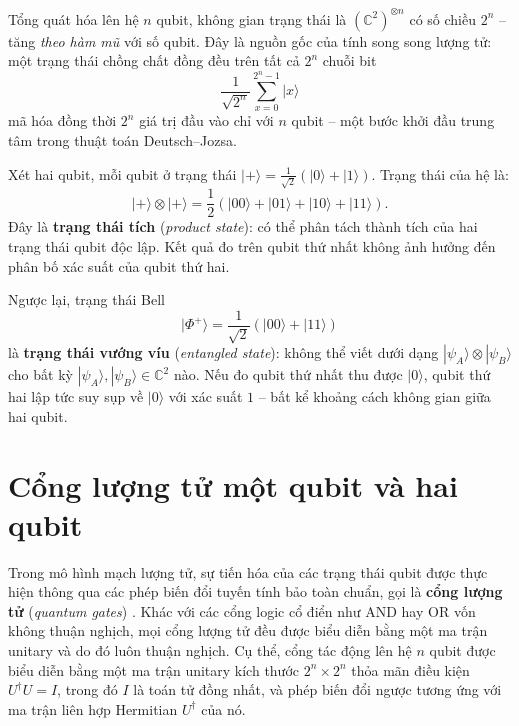 Tổng quát hóa lên hệ $n$ qubit, không gian trạng thái là $(\mathbb{C}^2)^{\otimes n}$
có số chiều $2^n$ -- tăng \emph{theo hàm mũ} với số qubit. Đây là nguồn gốc của
tính song song lượng tử: một trạng thái chồng chất đồng đều trên tất cả $2^n$ chuỗi
bit
\begin{equation}
    \frac{1}{\sqrt{2^n}}\sum_{x=0}^{2^n-1}|x\rangle
    \label{eq:uniform-superposition}
\end{equation}
mã hóa đồng thời $2^n$ giá trị đầu vào chỉ với $n$ qubit -- một bước khởi đầu trung
tâm trong thuật toán Deutsch--Jozsa.

\begin{example}
Xét hai qubit, mỗi qubit ở trạng thái $|+\rangle = \frac{1}{\sqrt{2}}(|0\rangle
+ |1\rangle)$. Trạng thái của hệ là:
$$|{+}\rangle \otimes |{+}\rangle
= \frac{1}{2}(|00\rangle + |01\rangle + |10\rangle + |11\rangle).$$
Đây là \textbf{trạng thái tích} (\textit{product state}): có thể phân tách thành
tích của hai trạng thái qubit độc lập. Kết quả đo trên qubit thứ nhất không ảnh
hưởng đến phân bố xác suất của qubit thứ hai.

Ngược lại, trạng thái Bell
$$|\Phi^+\rangle = \frac{1}{\sqrt{2}}(|00\rangle + |11\rangle)$$
là \textbf{trạng thái vướng víu} (\textit{entangled state}): không thể viết dưới
dạng $|\psi_A\rangle \otimes |\psi_B\rangle$ cho bất kỳ $|\psi_A\rangle,
|\psi_B\rangle \in \mathbb{C}^2$ nào. Nếu đo qubit thứ nhất thu được $|0\rangle$,
qubit thứ hai lập tức suy sụp về $|0\rangle$ với xác suất $1$ -- bất kể khoảng
cách không gian giữa hai qubit.
\end{example}


\section{Cổng lượng tử một qubit và hai qubit}
\label{sec:gates}

Trong mô hình mạch lượng tử, sự tiến hóa của các trạng thái qubit được thực hiện thông qua các phép biến đổi tuyến tính bảo toàn chuẩn, gọi là \textbf{cổng lượng tử} (\textit{quantum gates}) \cite{ref5}. Khác với các cổng logic cổ điển như AND hay OR vốn không thuận nghịch, mọi cổng lượng tử đều được biểu diễn bằng một ma trận unitary và do đó luôn thuận nghịch. Cụ thể, cổng tác động lên hệ $n$ qubit được biểu diễn bằng một ma trận unitary kích thước $2^n \times 2^n$ thỏa mãn điều kiện $U^\dagger U = I$, trong đó $I$ là toán tử đồng nhất, và phép biến đổi ngược tương ứng với ma trận liên hợp Hermitian $U^\dagger$ của nó.

